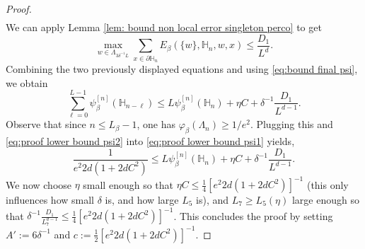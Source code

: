 \documentclass[11pt,a4paper]{article}
\numberwithin{equation}{section}
\theoremstyle{plain}
\theoremstyle{definition}
\begin{document}
\begin{proof}
\begin{multline}
\end{multline}
We can apply Lemma \ref{lem: bound non local error singleton perco} to get
\begin{equation}
	\max_{w\in \Lambda_{3\delta^{-1}L}}\sum_{x\in \partial \mathbb H_n}E_\beta(\{w\},\mathbb H_n,w,x)\leq \frac{D_1}{L^d}.
\end{equation}
Combining the two previously displayed equations and using \eqref{eq:bound final psi}, we obtain
\begin{equation}\label{eq:proof lower bound psi2}
\sum_{\ell=0}^{L-1}\psi_\beta^{[n]}(\mathbb H_{n-\ell})\le L\psi_\beta^{[n]}(\mathbb H_n)+\eta C+\delta^{-1}\frac{D_1}{L^{d-1}}.
\end{equation}
Observe that since $n\le L_\beta-1$, one has $\varphi_\beta(\Lambda_n)\ge 1/e^2$. Plugging this and \eqref{eq:proof lower bound psi2} into \eqref{eq:proof lower bound psi1} yields,
\begin{equation}
	\frac{1}{e^2 2d(1+2dC^2)}\leq L\psi_\beta^{[n]}(\mathbb H_n)+\eta C+\delta^{-1}\frac{D_1}{L^{d-1}}.
\end{equation}
We now choose $\eta$ small enough so that $\eta C\leq \tfrac{1}{4}[e^2 2d(1+2dC^2)]^{-1}$ (this only influences how small $\delta$ is, and how large $L_5$ is), and $L_7\geq L_5(\eta)$ large enough so that $\delta^{-1}\frac{D_1}{L_7^{d-1}}\leq \tfrac{1}{4}[e^2 2d(1+2dC^2)]^{-1}$. This concludes the proof by setting $A':=6\delta^{-1}$ and $c:=\tfrac{1}{2}[e^2 2d(1+2dC^2)]^{-1}$.
%

\end{proof}
\end{document}
